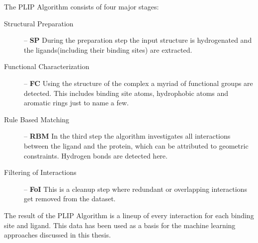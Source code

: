 The PLIP Algorithm consists of four major stages: 
\begin{description}
    \item[Structural Preparation] -- \textbf{SP} 
    \newline During the preparation step the input structure is hydrogenated and the ligands(including their binding sites) are extracted. 
    \item[Functional Characterization] -- \textbf{FC}
    \newline Using the structure of the complex a myriad of functional groups are detected. This includes binding site atoms, hydrophobic atoms and aromatic rings just to name a few.
    \item[Rule Based Matching] -- \textbf{RBM}
    \newline In the third step the algorithm investigates all interactions between the ligand and the protein, which can be attributed to geometric constraints. Hydrogen bonds are detected here.
    \item[Filtering of Interactions] -- \textbf{FoI}
    \newline This is a cleanup step where redundant or overlapping interactions get removed from the dataset. 
\end{description}
\newblock
The result of the PLIP Algorithm is a lineup of every interaction for each binding site and ligand\cite[]{Salentin2015}.
This data has been used as a basis for the machine learning approaches discussed in this thesis.